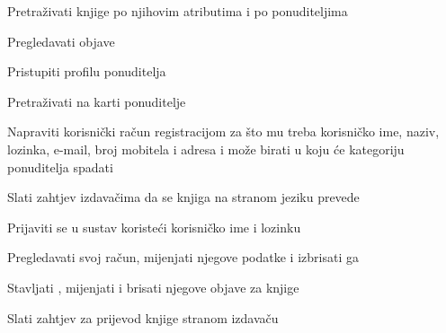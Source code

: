 			
			\begin{packed_enum}

				 \item {}
                
   				\begin{packed_enum}
       				\item Pretraživati knjige po njihovim atributima i po ponuditeljima
       				\item Pregledavati objave
       				\item Pristupiti profilu ponuditelja
			      	\item Pretraživati na karti ponuditelje                      				
                  				\end{packed_enum}
				\item  {}
				
				\begin{packed_enum}
					\item Napraviti korisnički račun registracijom za što mu treba korisničko ime, naziv, lozinka, e-mail, broj mobitela i adresa i može birati u koju će kategoriju ponuditelja spadati
					\item Slati zahtjev izdavačima da se knjiga na stranom jeziku prevede		
				\end{packed_enum}
			
				\item  {} %
				
				\begin{packed_enum}
					
					\item Prijaviti se u sustav koristeći korisničko ime i lozinku
                   				\item Pregledavati svoj račun, mijenjati njegove podatke i izbrisati ga
					\item Stavljati , mijenjati i brisati njegove objave za knjige
					
				\end{packed_enum}

				\item {}

                				\begin{packed_enum}
                    					\item Slati zahtjev za prijevod knjige stranom izdavaču
                				\end{packed_enum}


\end{packed_enum}
